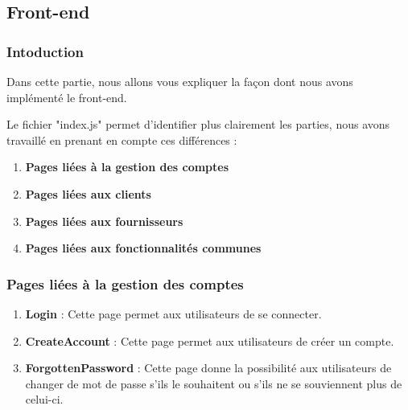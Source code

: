 \subsection{Front-end}
\subsubsection{Intoduction}
\begin{flushleft}
Dans cette partie, nous allons vous expliquer la façon dont nous avons implémenté le front-end.
\end{flushleft}
\begin{flushleft}
Le fichier "index.js" permet d'identifier plus clairement les parties, nous avons travaillé en prenant en compte ces différences : 
\end{flushleft}
\begin{enumerate}[-]
\item \textbf{Pages liées à la gestion des comptes}
\item \textbf{Pages liées aux clients}
\item \textbf{Pages liées aux fournisseurs}
\item \textbf{Pages liées aux fonctionnalités communes}
\end{enumerate} 
\subsubsection{Pages liées à la gestion des comptes}
\begin{enumerate}
\item \textbf{Login} :\newline
Cette page permet aux utilisateurs de se connecter.
\item \textbf{CreateAccount} :\newline
Cette page permet aux utilisateurs de créer un compte.
\item \textbf{ForgottenPassword} :\newline
Cette page donne la possibilité aux utilisateurs de changer de mot de passe s'ils le souhaitent ou s'ils ne se souviennent plus de celui-ci.
\end{enumerate}

